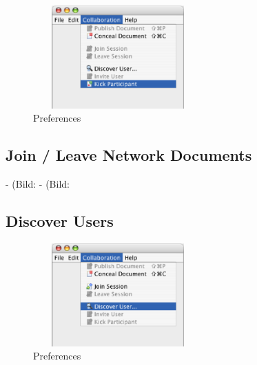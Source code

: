 \documentclass[11pt,a4paper]{article}
\begin{document}
\begin{figure}[H]
\begin{center}
  \includegraphics[height=1.56in, width=2.56in]{../images/usermanual/nmenu_collaboration_kick.bmp.eps}
\caption{Preferences}
\label{default}
\end{center}
\end{figure}

\subsection{Join / Leave Network Documents}

- (Bild: %
- (Bild: %

\subsection{Discover Users}

\begin{figure}[H]
\begin{center}
  \includegraphics[height=1.56in, width=2.56in]{../images/usermanual/nmenu_collaboration_discover.bmp.eps}
\caption{Preferences}
\label{default}
\end{center}
\end{figure}
\end{document}
